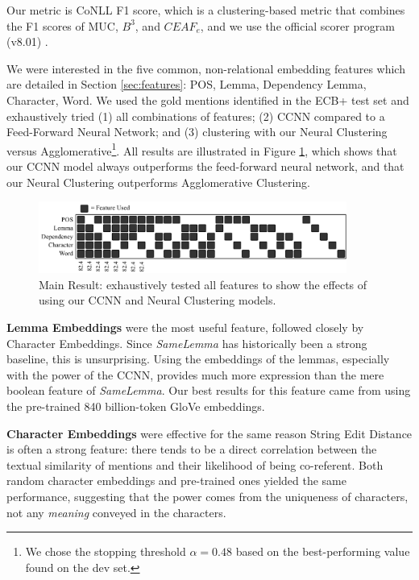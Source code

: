 \documentclass[11pt,a4paper]{article}
\begin{document}
Our metric is CoNLL F1 score, which is a clustering-based metric that combines the F1 scores of MUC, $B^{3}$, and $CEAF_{e}$, and we use the official scorer program (v8.01) \cite{Pradhan+etal:14a}.


We were interested in the five common, non-relational embedding features which are detailed in Section \ref{sec:features}: POS, Lemma, Dependency Lemma, Character, Word.  We used the gold mentions identified in the ECB+ test set and exhaustively tried (1) all combinations of features; (2) CCNN compared to a Feed-Forward Neural Network; and (3) clustering with our Neural Clustering versus Agglomerative\footnote{We chose the stopping threshold $\alpha=0.48$ based on the best-performing value found on the dev set.}.  All results are illustrated in Figure \ref{fig:allfeatures}, which shows that our CCNN model always outperforms the feed-forward neural network, and that our Neural Clustering outperforms Agglomerative Clustering.

\begin{figure}[h]
\label{fig:allfeatures}
\centering
    \includegraphics[width=0.9\textwidth]{features.pdf}
\caption{Main Result: exhaustively tested all features to show the effects of using our CCNN and Neural Clustering models.}
\end{figure}

\textbf{Lemma Embeddings} were the most useful feature, followed closely by Character Embeddings.  Since \textit{SameLemma} has historically been a strong baseline, this is unsurprising.  Using the embeddings of the lemmas, especially with the power of the CCNN, provides much more expression than the mere boolean feature of \textit{SameLemma}.  Our best results for this feature came from using the pre-trained 840 billion-token GloVe embeddings.

\textbf{Character Embeddings} were effective for the same reason String Edit Distance is often a strong feature: there tends to be a direct correlation between the textual similarity of mentions and their likelihood of being co-referent. Both random character embeddings and pre-trained ones yielded the same performance, suggesting that the power comes from the uniqueness of characters, not any \textit{meaning} conveyed in the characters.
\end{document}
